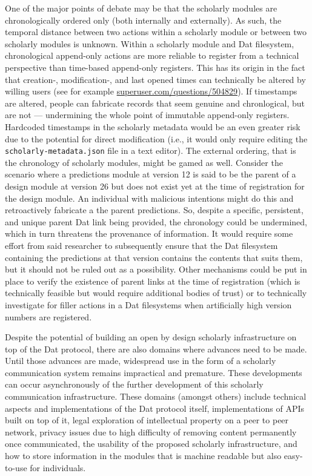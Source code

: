 \documentclass[a4paper]{article}
\begin{document}
One of the major points of debate may be that the scholarly modules are
chronologically ordered only (both internally and externally). As such,
the temporal distance between two actions within a scholarly module or
between two scholarly modules is unknown. Within a scholarly module and
Dat filesystem, chronological append-only actions are more reliable to
register from a technical perspective than time-based append-only
registers. This has its origin in the fact that creation-,
modification-, and last opened times can technically be altered by
willing users (see for example
\href{https://superuser.com/questions/504829}{superuser.com/questions/504829}).
If timestamps are altered, people can fabricate records that seem
genuine and chronlogical, but are not --- undermining the whole point of
immutable append-only registers. Hardcoded timestamps in the scholarly
metadata would be an even greater risk due to the potential for direct
modification (i.e., it would only require editing the
\texttt{scholarly-metadata.json} file in a text editor). The external
ordering, that is the chronology of scholarly modules, might be gamed as
well. Consider the scenario where a predictions module at version 12 is
said to be the parent of a design module at version 26 but does not
exist yet at the time of registration for the design module. An
individual with malicious intentions might do this and retroactively
fabricate a the parent predictions. So, despite a specific, persistent,
and unique parent Dat link being provided, the chronology could be
undermined, which in turn threatens the provenance of information. It
would require some effort from said researcher to subsequently ensure
that the Dat filesystem containing the predictions at that version
contains the contents that suits them, but it should not be ruled out as
a possibility. Other mechanisms could be put in place to verify the
existence of parent links at the time of registration (which is
technically feasible but would require additional bodies of trust) or to
technically investigate for filler actions in a Dat filesystems when
artificially high version numbers are registered.

Despite the potential of building an open by design scholarly
infrastructure on top of the Dat protocol, there are also domains where
advances need to be made. Until those advances are made, widespread use
in the form of a scholarly communication system remains impractical and
premature. These developments can occur asynchronously of the further
development of this scholarly communication infrastructure. These
domains (amongst others) include technical aspects and implementations
of the Dat protocol itself, implementations of APIs built on top of it,
legal exploration of intellectual property on a peer to peer network,
privacy issues due to high difficulty of removing content permanently
once communicated, the usability of the proposed scholarly
infrastructure, and how to store information in the modules that is
machine readable but also easy-to-use for individuals.
\end{document}
